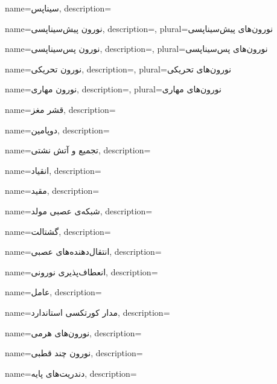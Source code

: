 {
	name={سیناپس},
	description=\hfill{}
}

{
	name={نورون پیش‌سیناپسی},
	description=\hfill{},
    plural={نورون‌های پیش‌سیناپسی}
}

{
	name={نورون پس‌سیناپسی},
	description=\hfill{},
    plural={نورون‌های پس‌سیناپسی}
}

{
	name={نورون تحریکی},
	description=\hfill{},
    plural={نورون‌های تحریکی}
}

{
	name={نورون مهاری},
	description=\hfill{},
    plural={نورون‌های مهاری}
}

{
	name={قشر مغز},
	description=\hfill{}
}

{
    name={دوپامین},
    description=\hfill{}
}

{
    name={تجمیع و آتش نشتی},
    description=\hfill{}
}


{
	name={انقیاد},
	description=\hfill{}
}

{
name={مقید},
description=\hfill{}
}

{
name={شبکه‌ی عصبی مولد},
description=\hfill{}
}

{
	name={گشتالت},
	description=\hfill{}
}

{
	name={انتقال‌دهنده‌های عصبی},
	description=\hfill{}
}

{
	name={انعطاف‌پذیری نورونی},
	description=\hfill{}
}

{
	name={عامل},
	description=\hfill{}
}

{
	name={مدار کورتکسی استاندارد},
	description=\hfill{}
}

{
	name={نورون‌های هرمی},
	description=\hfill{}
}

{
name={نورون چند قطبی},
description=\hfill{}
}

{
name={دندریت‌های پایه},
description=\hfill{}
}

